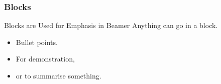 \documentclass[aspectratio=169]{beamer}
\begin{document}
%
%
\begin{frame}
\frametitle{Blocks}
   \begin{block}{Blocks are Used for Emphasis in Beamer}
      Anything can go in a block.
      \begin{itemize}
         \item Bullet points.
         \item For demonstration,
         \item or to summarise something.
      \end{itemize}
   \end{block}
\end{frame}
\end{document}
